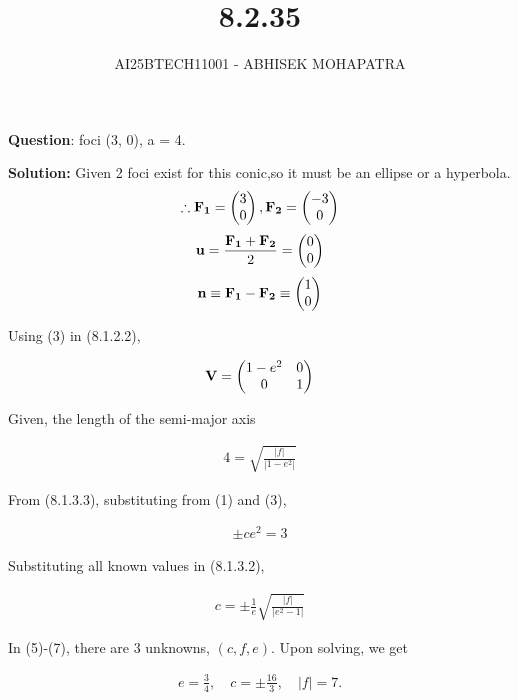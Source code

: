 \documentclass{beamer}
\title{8.2.35}
\author{AI25BTECH11001 - ABHISEK MOHAPATRA}
\numberwithin{equation}{section}
\begin{document}
{\let\newpage\relax\maketitle}
\renewcommand{\thefigure}{\theenumi}
\renewcommand{\thetable}{\theenumi}





	 	\textbf{Question}:
foci (3, 0), a = 4.

		\textbf{Solution:}
		Given 2 foci exist for this conic,so it must be an ellipse or a hyperbola.
\begin{align}
		\therefore \mathbf{F_1} =\begin{pmatrix}3\\0\end{pmatrix}, \mathbf{F_2} =\begin{pmatrix}-3\\0\end{pmatrix}
\end{align}
\begin{align}
		\mathbf{u} = \frac{\mathbf{F_1}+\mathbf{F_2}}{2} = \begin{pmatrix}0\\0\end{pmatrix}
\end{align}
\begin{align}
		\mathbf{n} \equiv \mathbf{F_1} - \mathbf{F_2} \equiv \begin{pmatrix}1\\0\end{pmatrix}
\end{align}

Using (3) in (8.1.2.2),

\begin{align}
		\mathbf{V} = \begin{pmatrix}1-e^2 & 0 \\ 0 & 1\end{pmatrix}
\end{align}

Given, the length of the semi-major axis

\begin{align}
		4 = \sqrt{\frac{|f|}{|1-e^2|}}
\end{align}


From (8.1.3.3), substituting from (1) and (3),

\begin{align}
\pm c e^2 = 3
\end{align}

Substituting all known values in (8.1.3.2),

\begin{align}
c = \pm \frac{1}{e} \sqrt{\frac{|f|}{|e^2-1|}}
\end{align}

In (5)-(7), there are 3 unknowns, $(c, f, e)$. Upon solving, we get  

\begin{align}
e = \frac{3}{4}, 
\quad c = \pm \frac{16}{3}, 
\quad |f| = 7.
\end{align}
\end{document}
